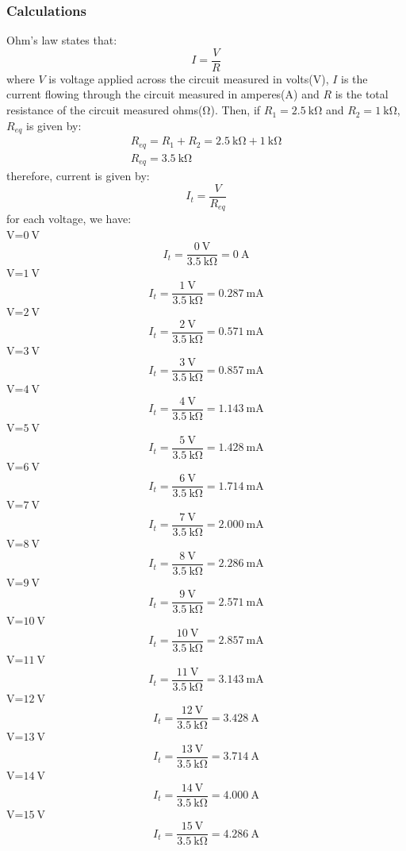 \documentclass[a4paper]{article}
\begin{document}
\subsubsection{Calculations}
Ohm's law states that:
\[I=\frac{V}{R}\]
where $V$ is voltage applied across the circuit measured in volts($\si{\volt}$), $I$ is the current flowing
through the circuit measured in amperes($\si{\ampere}$) and $R$ is the total resistance of the
circuit measured ohms($\si{\ohm}$).
Then, if $R_1=\SI{2.5}{\kilo\ohm}$ and $R_2=\SI{1}{\kilo\ohm}$, $R_{eq}$ is given by:
\begin{gather*}
    R_{eq}=R_1+R_2=\SI{2.5}{\kilo\ohm}+\SI{1}{\kilo\ohm}\\
    R_{eq}=\SI{3.5}{\kilo\ohm}
\end{gather*}
therefore, current is given by:
\[I_t=\frac{V}{R_{eq}}\]
for each voltage, we have:\\
V=$\SI{0}{\volt}$
\[I_t=\frac{\SI{0}{\volt}}{\SI{3.5}{\kilo\ohm}}=\SI{0}{\ampere}\]
V=$\SI{1}{\volt}$
\[I_t=\frac{\SI{1}{\volt}}{\SI{3.5}{\kilo\ohm}}=\SI{0.287}{\milli\ampere}\]
V=$\SI{2}{\volt}$
\[I_t=\frac{\SI{2}{\volt}}{\SI{3.5}{\kilo\ohm}}=\SI{0.571}{\milli\ampere}\]
V=$\SI{3}{\volt}$
\[I_t=\frac{\SI{3}{\volt}}{\SI{3.5}{\kilo\ohm}}=\SI{0.857}{\milli\ampere}\]
V=$\SI{4}{\volt}$
\[I_t=\frac{\SI{4}{\volt}}{\SI{3.5}{\kilo\ohm}}=\SI{1.143}{\milli\ampere}\]
V=$\SI{5}{\volt}$
\[I_t=\frac{\SI{5}{\volt}}{\SI{3.5}{\kilo\ohm}}=\SI{1.428}{\milli\ampere}\]
V=$\SI{6}{\volt}$
\[I_t=\frac{\SI{6}{\volt}}{\SI{3.5}{\kilo\ohm}}=\SI{1.714}{\milli\ampere}\]
V=$\SI{7}{\volt}$
\[I_t=\frac{\SI{7}{\volt}}{\SI{3.5}{\kilo\ohm}}=\SI{2.000}{\milli\ampere}\]
V=$\SI{8}{\volt}$
\[I_t=\frac{\SI{8}{\volt}}{\SI{3.5}{\kilo\ohm}}=\SI{2.286}{\milli\ampere}\]
V=$\SI{9}{\volt}$
\[I_t=\frac{\SI{9}{\volt}}{\SI{3.5}{\kilo\ohm}}=\SI{2.571}{\milli\ampere}\]
V=$\SI{10}{\volt}$
\[I_t=\frac{\SI{10}{\volt}}{\SI{3.5}{\kilo\ohm}}=\SI{2.857}{\milli\ampere}\]
V=$\SI{11}{\volt}$
\[I_t=\frac{\SI{11}{\volt}}{\SI{3.5}{\kilo\ohm}}=\SI{3.143}{\milli\ampere}\]
V=$\SI{12}{\volt}$
\[I_t=\frac{\SI{12}{\volt}}{\SI{3.5}{\kilo\ohm}}=\SI{3.428}{\ampere}\]
V=$\SI{13}{\volt}$
\[I_t=\frac{\SI{13}{\volt}}{\SI{3.5}{\kilo\ohm}}=\SI{3.714}{\ampere}\]
V=$\SI{14}{\volt}$
\[I_t=\frac{\SI{14}{\volt}}{\SI{3.5}{\kilo\ohm}}=\SI{4.000}{\ampere}\]
V=$\SI{15}{\volt}$
\[I_t=\frac{\SI{15}{\volt}}{\SI{3.5}{\kilo\ohm}}=\SI{4.286}{\ampere}\]
\end{document}
